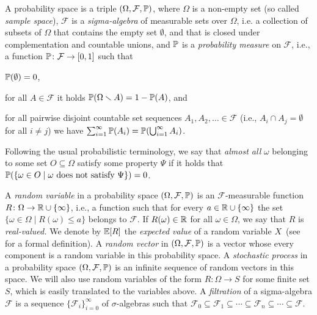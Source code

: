 \smallskip{}
 A probability space is a triple
$(\Omega,\mathcal{F},\mathbb{P})$, where $\Omega$ is a non-empty set (so called
\emph{sample space}), $\mathcal{F}$ is a \emph{sigma-algebra} of measurable 
sets over $\Omega$,
i.e. a collection of subsets of $\Omega$ that contains the empty set
$\emptyset$, and that is closed under complementation and countable unions, and
$\mathbb{P}$ is a \emph{probability measure} on $\mathcal{F}$, i.e., a function
$\mathbb{P}\colon \mathcal{F}\rightarrow[0,1]$ such that
\begin{compactitem}
\item $\mathbb{P}(\emptyset)=0$,
\item for all $A\in \mathcal{F}$ it holds $\mathbb{P}(\Omega\smallsetminus
A)=1-\mathbb{P}(A)$, and
\item for all pairwise disjoint countable set sequences $A_1,A_2,\dots \in
\mathcal{F}$ (i.e., $A_i \cap A_j = \emptyset$ for all $i\neq j$)
we have $\sum_{i=1}^{\infty}\mathbb{P}(A_i)=\mathbb{P}(\bigcup_{i=1}^{\infty} A_i)$.
\end{compactitem}

Following the usual probabilistic terminology, we say that \emph{almost all} $\omega$ belonging to some set $O\subseteq \Omega$ satisfy some property $\Psi$ if it holds that $\mathbb{P}{(\{\omega\in O\mid \omega \text{ does not satisfy }\Psi\})}=0$.

A \emph{random variable} in a probability space $(\Omega,\mathcal{F},\mathbb{P})$ is
an $\mathcal{F}$-measurable function $R\colon \Omega \rightarrow \mathbb{R} \cup
\{\infty\}$, i.e.,
a function such that for every $a\in \mathbb{R} \cup \{ \infty\}$ the set
$\{\omega\in \Omega\mid R(\omega)\leq a\}$ belongs to $\mathcal{F}$. If 
$R(\omega)\in \mathbb{R}$ for all $\omega\in \Omega$, we say that $R$ is 
\emph{real-valued.}
We denote by $\mathbb{E}[R]$ the \emph{expected value} of a random variable $X$~(see \cite[Chapter 5]{Billingsley:book}
for a formal definition). 
A \emph{random vector} in $(\Omega,\mathcal{F},\mathbb{P})$ is a vector whose every component is a random 
variable in this probability space. A \emph{stochastic process} in a 
probability space $(\Omega,\mathcal{F},\mathbb{P})$ is an infinite sequence of 
random vectors in this space.
We will also use random variables of the form $R\colon\Omega \rightarrow S$ for some finite 
set $S$, which is easily translated to the variables above.
A \emph{filtration} of a sigma-algebra $\mathcal{F}$ is a
sequence $\{\mathcal{F}_i \}_{i=0}^{\infty}$ of $\sigma$-algebras 
such that $\mathcal{F}_0 \subseteq \mathcal{F}_1 \subseteq \cdots \subseteq
\mathcal{F}_n \subseteq \cdots \subseteq \mathcal{F}$.


